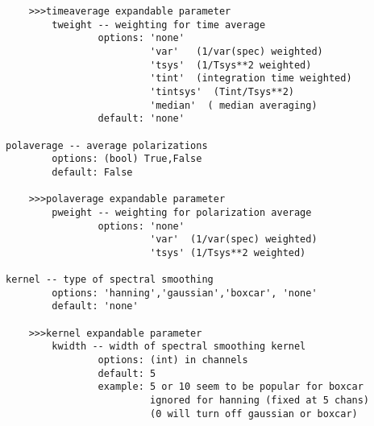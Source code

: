 \begin{verbatim}
    >>>timeaverage expandable parameter
        tweight -- weighting for time average
                options: 'none'
                         'var'   (1/var(spec) weighted)
                         'tsys'  (1/Tsys**2 weighted)
                         'tint'  (integration time weighted)
                         'tintsys'  (Tint/Tsys**2)
                         'median'  ( median averaging)
                default: 'none'

polaverage -- average polarizations
        options: (bool) True,False
        default: False

    >>>polaverage expandable parameter
        pweight -- weighting for polarization average
                options: 'none'
                         'var'  (1/var(spec) weighted)
                         'tsys' (1/Tsys**2 weighted)
                          
kernel -- type of spectral smoothing
        options: 'hanning','gaussian','boxcar', 'none'
        default: 'none'

    >>>kernel expandable parameter
        kwidth -- width of spectral smoothing kernel
                options: (int) in channels
                default: 5
                example: 5 or 10 seem to be popular for boxcar
                         ignored for hanning (fixed at 5 chans)
                         (0 will turn off gaussian or boxcar)


\end{verbatim}
